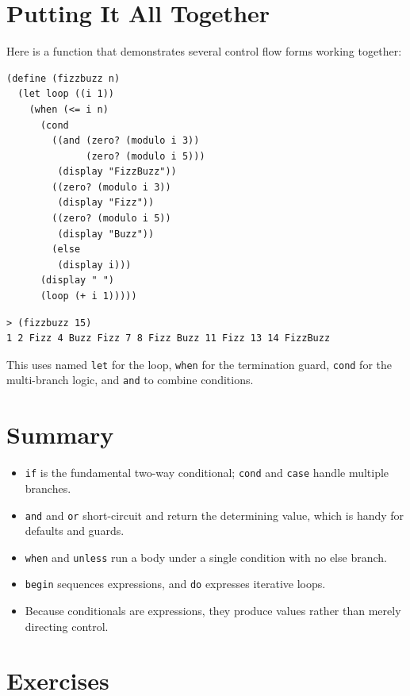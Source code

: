 \section{Putting It All Together}

Here is a function that demonstrates several control flow forms working together:

\begin{lstlisting}
(define (fizzbuzz n)
  (let loop ((i 1))
    (when (<= i n)
      (cond
        ((and (zero? (modulo i 3))
              (zero? (modulo i 5)))
         (display "FizzBuzz"))
        ((zero? (modulo i 3))
         (display "Fizz"))
        ((zero? (modulo i 5))
         (display "Buzz"))
        (else
         (display i)))
      (display " ")
      (loop (+ i 1)))))
\end{lstlisting}

\begin{lstlisting}[style=repl]
> (fizzbuzz 15)
1 2 Fizz 4 Buzz Fizz 7 8 Fizz Buzz 11 Fizz 13 14 FizzBuzz
\end{lstlisting}

This uses named \texttt{let} for the loop, \texttt{when} for the termination guard, \texttt{cond} for the multi-branch logic, and \texttt{and} to combine conditions.

\section*{Summary}

\begin{itemize}
    \item \texttt{if} is the fundamental two-way conditional; \texttt{cond} and \texttt{case} handle multiple branches.
    \item \texttt{and} and \texttt{or} short-circuit and return the determining value, which is handy for defaults and guards.
    \item \texttt{when} and \texttt{unless} run a body under a single condition with no else branch.
    \item \texttt{begin} sequences expressions, and \texttt{do} expresses iterative loops.
    \item Because conditionals are expressions, they produce values rather than merely directing control.
\end{itemize}

\section*{Exercises}

